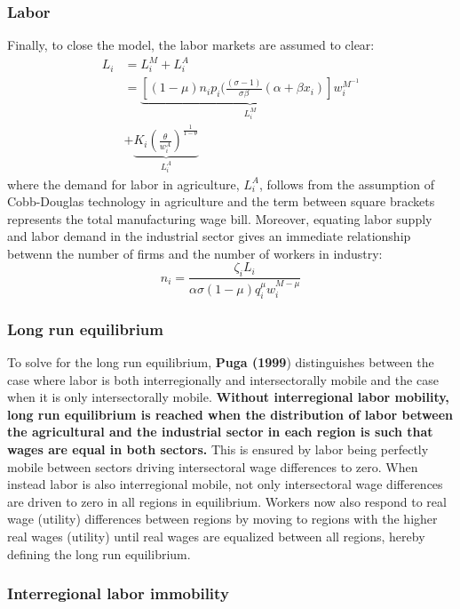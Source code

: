 \documentclass[twocolumn]{article}
\begin{document}
\subsubsection{Labor}
Finally, to close the model, the labor markets are assumed to clear:
\begin{equation}
    \begin{aligned}
    L_i &= L_i^M + L_i^A \\
    &= \underbrace{[(1-\mu)n_i p_i (\frac{(\sigma -1)}{\sigma \beta}(\alpha+ \beta x_i)]w_i^{M^{-1}}}_{L_i^M}\\
    &+ \underbrace{K_i(\frac{\theta}{w_i^A})^{\frac{1}{1-\theta}}}_{L_i^A}
    \end{aligned}
\end{equation}
where the demand for labor in agriculture, $L_i^A$, follows from the assumption of Cobb-Douglas technology in agriculture and the term between square brackets represents the total manufacturing wage bill. Moreover, equating labor supply and labor demand in the industrial sector gives an immediate relationship betwenn the number of firms and the number of workers in industry:
\begin{equation}
    n_i = \frac{\zeta_i L_i}{\alpha \sigma (1-\mu)q_i^{\mu}w_i^{M-\mu}} 
\end{equation}
\subsubsection{Long run equilibrium}
To solve for the long run equilibrium, \textbf{Puga (1999}) distinguishes between the case where labor is both interregionally and intersectorally mobile and the case when it is only intersectorally mobile. \textbf{Without interregional labor mobility, long run equilibrium is reached when the distribution of labor between the agricultural and the industrial sector in each region is such that wages are equal in both sectors.} This is ensured by labor being perfectly mobile between sectors driving intersectoral wage differences to zero. When instead labor is also interregional mobile, not only intersectoral wage differences are driven to zero in all regions in equilibrium. Workers now also respond to real wage (utility) differences between regions by moving to regions with the higher real wages (utility) until real wages are equalized between all regions, hereby defining the long run equilibrium.

\subsubsection{Interregional labor immobility}
\end{document}
